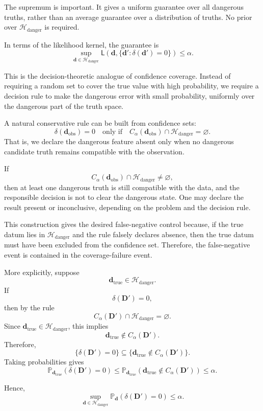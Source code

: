 \documentclass[11pt]{article}
\newcommand{\Dobsrand}{\mathbf D'}
\newcommand{\dtrue}{\mathbf d_{\mathrm{true}}}
\newcommand{\dobs}{\mathbf d_{\mathrm{obs}}}
\newcommand{\Calpha}{C_{\alpha}}
\newcommand{\Prob}{\mathbb P}
\begin{document}
The supremum is important. It gives a uniform guarantee over all dangerous truths, rather than an average guarantee over a distribution of truths. No prior over \(\mathcal H_{\mathrm{danger}}\) is required.

In terms of the likelihood kernel, the guarantee is
\[
    \sup_{\mathbf d\in\mathcal H_{\mathrm{danger}}}
    \mathsf L
    \left(
        \mathbf d,
        \{\mathbf d':\delta(\mathbf d')=0\}
    \right)
    \leq
    \alpha.
\]

This is the decision-theoretic analogue of confidence coverage. Instead of requiring a random set to cover the true value with high probability, we require a decision rule to make the dangerous error with small probability, uniformly over the dangerous part of the truth space.

A natural conservative rule can be built from confidence sets:
\[
    \delta(\dobs)=0
    \quad
    \text{only if}
    \quad
    \Calpha(\dobs)\cap\mathcal H_{\mathrm{danger}}=\varnothing.
\]
That is, we declare the dangerous feature absent only when no dangerous candidate truth remains compatible with the observation.

If
\[
    \Calpha(\dobs)\cap\mathcal H_{\mathrm{danger}}\neq\varnothing,
\]
then at least one dangerous truth is still compatible with the data, and the responsible decision is not to clear the dangerous state. One may declare the result present or inconclusive, depending on the problem and the decision rule.

This construction gives the desired false-negative control because, if the true datum lies in \(\mathcal H_{\mathrm{danger}}\) and the rule falsely declares absence, then the true datum must have been excluded from the confidence set. Therefore, the false-negative event is contained in the coverage-failure event.

More explicitly, suppose
\[
    \dtrue\in\mathcal H_{\mathrm{danger}}.
\]
If
\[
    \delta(\Dobsrand)=0,
\]
then by the rule
\[
    \Calpha(\Dobsrand)\cap\mathcal H_{\mathrm{danger}}=\varnothing.
\]
Since \(\dtrue\in\mathcal H_{\mathrm{danger}}\), this implies
\[
    \dtrue\notin\Calpha(\Dobsrand).
\]
Therefore,
\[
    \{\delta(\Dobsrand)=0\}
    \subseteq
    \{\dtrue\notin\Calpha(\Dobsrand)\}.
\]
Taking probabilities gives
\[
    \Prob_{\dtrue}
    \left(
        \delta(\Dobsrand)=0
    \right)
    \leq
    \Prob_{\dtrue}
    \left(
        \dtrue\notin\Calpha(\Dobsrand)
    \right)
    \leq
    \alpha.
\]

Hence,
\[
    \sup_{\mathbf d\in\mathcal H_{\mathrm{danger}}}
    \Prob_{\mathbf d}
    \left(
        \delta(\Dobsrand)=0
    \right)
    \leq
    \alpha.
\]
\end{document}
